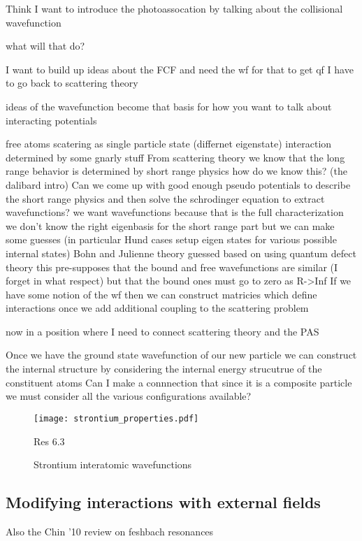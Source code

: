 Think I want to introduce the photoassocation by talking about the collisional wavefunction

what will that do?

I want to build up ideas about the FCF and need the wf for that
	to get qf I have to go back to scattering theory

ideas of the wavefunction become that basis for how you want to talk about interacting potentials


free atoms
scatering as single particle state (differnet eigenstate)
	interaction determined by some gnarly stuff
From scattering theory we know that the long range behavior is determined by short range physics
	how do we know this? (the dalibard intro)
Can we come up with good enough pseudo potentials to describe the short range physics and then solve the schrodinger equation to extract wavefunctions?
	we want wavefunctions because that is the full characterization
	we don't know the right eigenbasis for the short range part but we can make some guesses (in particular Hund cases setup eigen states for various possible internal states)
	Bohn and Julienne theory guessed based on using quantum defect theory
		this pre-supposes that the bound and free wavefunctions are similar (I forget in what respect) but that the bound ones must go to zero as R->Inf
If we have some notion of the wf then we can construct matricies which define interactions once we add additional coupling to the scattering problem


now in a position where I need to connect scattering theory and the PAS


Once we have the ground state wavefunction of our new particle we can construct the internal structure by considering the internal energy strucutrue of the constituent atoms
	Can I make a connnection that since it is a composite particle we must consider all the various configurations available?
	
\begin{figure} \label{fig:ch3_sr_scat_wf}
	\centerline{
	\texttt{[image: strontium\_properties.pdf]}}
	\caption{Strontium interatomic wavefunctions}{Res 6.3}
\end{figure} 

\subsection{Modifying interactions with external fields} \label{ssec:mod_int}

Also the Chin '10 review on feshbach resonances

